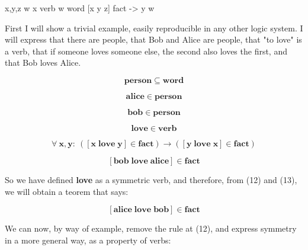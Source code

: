 \documentclass{IOS-Book-Article}     %
\begin{document}
\forall x,y,z \exist w
x \is verb
w \subseteq word
[x y z] \is fact
->
y \is w

















First I will show a trivial example, easily reproducible in any other logic
system. I will express that there are people, that Bob and Alice are people,
that "to love" is a verb, that if someone loves someone else, the second also
loves the first, and that Bob loves Alice.

\begin{equation}
  \mathbf{person}\subseteq \mathbf{word}
\end{equation}

\begin{equation}
  \mathbf{alice}\in \mathbf{person}
\end{equation}

\begin{equation}
  \mathbf{bob}\in \mathbf{person}
\end{equation}

\begin{equation}
  \mathbf{love}\in \mathbf{verb}
\end{equation}

\begin{equation}
\forall\:\mathbf{x\mathrm{,\mathbf{y\mathrm{:\:\left(\left[\mathbf{x\; love\; y}\right]\in \mathbf{fact}\right)}\rightarrow\left(\left[\mathbf{y\; love\; x}\right]\in \mathbf{fact}\right)}}}
\end{equation}

\begin{equation}
  \left[\mathbf{bob\; love\; alice}\right]\in \mathbf{fact}
\end{equation}

So we have defined \textbf{love} as a symmetric verb, and therefore, from
(12) and (13), we will obtain a teorem that says:

\begin{equation}
  \left[\mathbf{alice\; love\; bob}\right]\in \mathbf{fact}
\end{equation}

We can now, by way of example, remove the rule at (12), and express symmetry
in a more general way, as a property of verbs:
\end{document}

